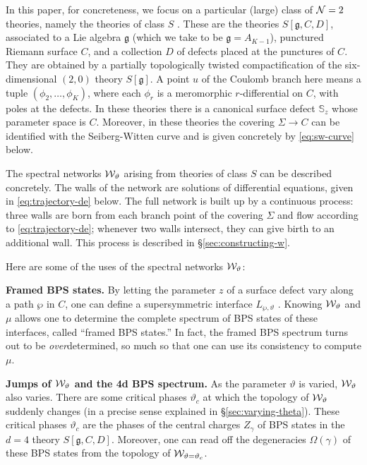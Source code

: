 \documentclass[11pt,a4paper]{article}
\def\fg{\mathfrak{g}}
\def\wnet {{\cal W}}
\newcommand{\ti}[1]{\textit{#1}}
\def\fg{\mathfrak{g}}
\def\wnet {{\cal W}}
\newcommand\N{{\cal N}}
\newcommand{\bS}{\mathbb S}
\begin{document}
\medskip

In this paper, for concreteness, we focus on a particular (large) class of $\N=2$ theories,
namely the theories of class $S$ \cite{Witten:1997sc,Gaiotto:2009we,Gaiotto:2009hg}.
These are the theories $S[\fg,C,D]$, associated to
a Lie algebra $\fg$ (which we take to be $\fg = A_{K-1}$),
punctured Riemann surface $C$, and a collection $D$
of defects placed at the punctures of $C$.
They are obtained by a partially topologically twisted compactification
of the six-dimensional $(2,0)$ theory $S[\fg]$.
A point $u$ of the Coulomb branch here means a
tuple $(\phi_2, \dots, \phi_K)$, where each $\phi_r$ is a
meromorphic $r$-differential on $C$, with poles at the defects.
In these theories there is
a canonical surface defect $\bS_z$ whose parameter space is $C$.
Moreover, in these theories the covering $\Sigma \to C$ can be identified with the
Seiberg-Witten curve \cite{Gaiotto:2009fs,Gaiotto:2011tf} and is given concretely by \eqref{eq:sw-curve} below.

The spectral networks $\wnet_\vartheta$ arising from theories of class $S$ can be described concretely.
The walls of the network are solutions of differential equations, given in \eqref{eq:trajectory-de} below.
The full network is built up by a continuous process:  three walls are born from each branch point of
the covering $\Sigma$ and flow according to \eqref{eq:trajectory-de}; whenever
two walls intersect, they can give birth to an additional wall.  This process is described in \S\ref{sec:constructing-w}.

\medskip

Here are some of the uses of the spectral networks $\wnet_\vartheta$:

\smallskip
{\bf Framed BPS states.} By letting the parameter $z$ of a surface defect vary along a path $\wp$ in $C$, one can define a supersymmetric interface $L_{\wp,\vartheta}$ \cite{Gaiotto:2011tf}.
Knowing $\wnet_\vartheta$ and $\mu$ allows one to determine the complete spectrum of BPS states of
these interfaces, called ``framed BPS states.''  In fact, the framed BPS spectrum turns out to be \ti{over}determined, so much so that one can use its consistency to compute $\mu$.

\smallskip
{\bf Jumps of $\wnet_\vartheta$ and the 4d BPS spectrum.} As the parameter $\vartheta$
is varied, $\wnet_\vartheta$ also varies.  There are some critical phases $\vartheta_c$
at which the topology of $\wnet_\vartheta$ suddenly changes (in a precise sense explained in
\S \ref{sec:varying-theta}).
These critical phases $\vartheta_c$
are the phases of the central charges $Z_\gamma$ of BPS states in the $d=4$ theory $S[ \fg,C,D]$.
Moreover, one can read off the degeneracies $\Omega(\gamma)$ of these BPS states from
the topology of $\wnet_{\vartheta = \vartheta_c}$.
\end{document}
